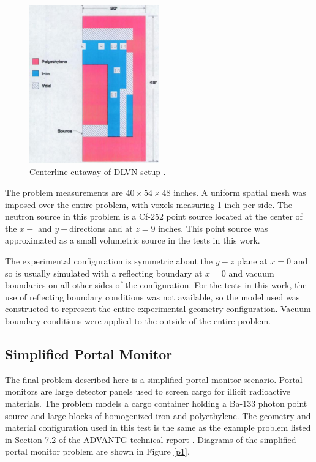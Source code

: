 \documentclass{article} %
\begin{document}
\begin{figure}[!htb]
\centering
\includegraphics[width=0.5\textwidth]{img/dlvn.png}
\caption{Centerline cutaway of DLVN setup \cite{sw-dlvn}.}
\label{dlvn}
\end{figure}

The problem measurements are $40\times54\times48$ inches. A uniform spatial
mesh was imposed over the entire problem, with voxels measuring 1 inch per side.
The neutron source in this problem is a Cf-252 point source located at the 
center of the $x-$ and $y-$directions and at $z = 9$ inches.
This point source was approximated as a small volumetric source in the tests in
this work.

The experimental configuration is symmetric about the $y-z$ plane at $x = 0$
and so is usually simulated with a reflecting boundary at $x = 0$ and vacuum
boundaries on all other sides of the configuration. For the tests in this work,
the use of reflecting boundary conditions was not available, so the model used 
was constructed to represent the entire experimental geometry configuration.
Vacuum boundary conditions were applied to the outside of the entire problem.

\subsection{Simplified Portal Monitor}

The final problem described here is a simplified portal monitor scenario.
Portal monitors are large detector panels used to screen cargo for illicit
radioactive materials. The problem models a cargo container holding a Ba-133
photon point source and large blocks of homogenized iron and polyethylene. 
The geometry and material configuration used in this test is the same as the
example problem listed in Section 7.2 of the ADVANTG technical report
\cite{advantg}. Diagrams of the simplified portal monitor problem are shown in
Figure \ref{p1}.
\end{document}
